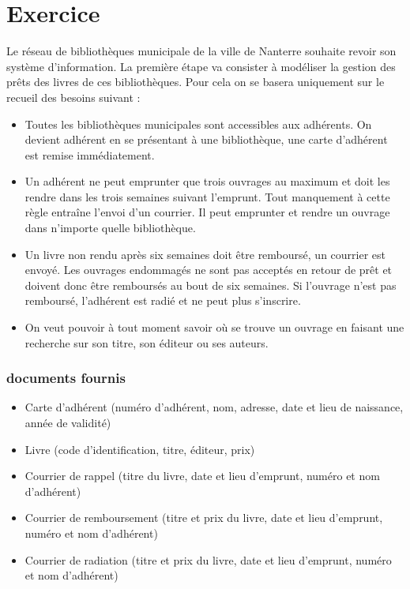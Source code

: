 \section*{Exercice}

Le réseau de bibliothèques municipale de la ville de Nanterre souhaite revoir son système d'information. La première étape va consister à modéliser la gestion des prêts des livres de ces bibliothèques. Pour cela on se basera uniquement sur le recueil des besoins suivant : \\
\begin{itemize}
	\item Toutes les bibliothèques municipales sont accessibles aux adhérents. On devient adhérent en se présentant à une bibliothèque, une carte d'adhérent est remise immédiatement.
	\item Un adhérent ne peut emprunter que trois ouvrages au maximum et doit les rendre dans les trois semaines suivant l'emprunt. Tout manquement à cette règle entraîne l’envoi d'un courrier. Il peut emprunter et rendre un ouvrage dans n'importe quelle bibliothèque.
	\item Un livre non rendu après six semaines doit être remboursé, un courrier est envoyé. Les ouvrages endommagés ne sont pas acceptés en retour de prêt et doivent donc être remboursés au bout de six semaines. Si l'ouvrage n'est pas remboursé, l'adhérent est radié et ne peut plus s'inscrire.
	\item On veut pouvoir à tout moment savoir où se trouve un ouvrage en faisant une recherche sur son titre, son éditeur ou ses auteurs.
\end{itemize}

\subsubsection*{documents fournis}
\begin{itemize}
	\item Carte d'adhérent (numéro d'adhérent, nom, adresse, date et lieu de naissance, année de validité)
	\item Livre (code d'identification, titre, éditeur, prix)
	\item Courrier de rappel (titre du livre, date et lieu d'emprunt, numéro et nom d'adhérent)
	\item Courrier de remboursement (titre et prix du livre, date et lieu d'emprunt, numéro et nom d'adhérent)
	\item Courrier de radiation (titre et prix du livre, date et lieu d'emprunt, numéro et nom d'adhérent)
\end{itemize}

